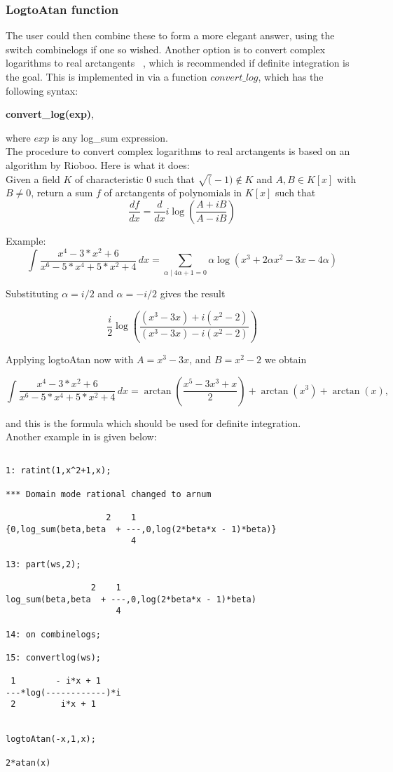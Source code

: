 \subsubsection{LogtoAtan function}
The user could then combine these to form a more elegant answer, using the switch combinelogs if one so wished. Another option is to convert complex logarithms to real arctangents ~\cite{Bron97}, which is recommended if definite integration is the goal. This is implemented in \REDUCE via a function $convert\_log$, which has the following syntax:
\begin{center} \textbf{convert\_log(exp)}, \end{center}
where $exp$ is any log\_sum expression.\\[\baselineskip]
%
The procedure to convert complex logarithms to real arctangents is based on an algorithm by Rioboo. Here is what it does: \\[\baselineskip]
%
Given a field $K$ of characteristic 0 such that $\sqrt(-1) \not\in K$ and 
$A, B \in K[x]$ with $B \not = 0$, return a sum $f$ of arctangents of polynomials in $K[x]$ such that
\[  \frac{df}{dx}=\frac{d}{dx} i \log(\frac{A+ i B}{A- i B}) \]

Example:
\[ \int \frac{x^4-3*x^2+6}{x^6-5*x^4+5*x^2+4} \, dx = \sum_{ \alpha \mid 4\alpha+1=0} \alpha \log(x^3+2\alpha x^2-3 x-4 \alpha) \]

Substituting $\alpha=i/2$ and $\alpha=-i/2$ gives the result

\[ \frac{i}{2} \log(\frac{(x^3-3 x)+i (x^2-2)}{(x^3-3 x)-i (x^2-2)}) \]

Applying logtoAtan now with $A=x^3-3 x$, and $B=x^2-2$ we obtain

\[ \int \frac{x^4-3*x^2+6}{x^6-5*x^4+5*x^2+4} \, dx = \arctan(\frac{x^5-3 x^3+x}{2})+\arctan(x^3)+\arctan(x) , \]

and this is the formula which should be used for definite integration. \\[\baselineskip]
%
Another example in \REDUCE is given below:
\begin{verbatim}

1: ratint(1,x^2+1,x);

*** Domain mode rational changed to arnum

                    2    1
{0,log_sum(beta,beta  + ---,0,log(2*beta*x - 1)*beta)}
                         4

13: part(ws,2);

                 2    1
log_sum(beta,beta  + ---,0,log(2*beta*x - 1)*beta)
                      4

14: on combinelogs;

15: convertlog(ws);

 1        - i*x + 1
---*log(------------)*i 
 2         i*x + 1


logtoAtan(-x,1,x);

2*atan(x) 

\end{verbatim}
